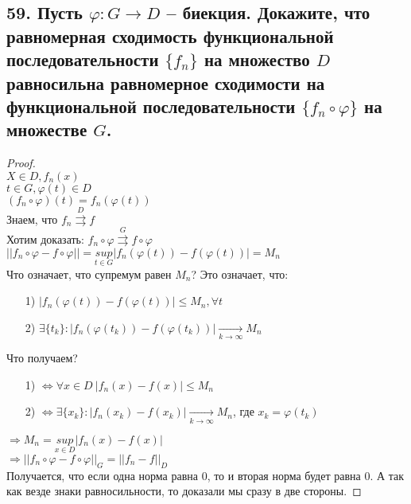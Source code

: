 \documentclass[a4paper, fleqn]{article}
\begin{document}
    \subsection*{59. Пусть $\displaystyle \varphi: G \to D$ -- биекция. Докажите, что
    равномерная сходимость функциональной последовательности $\displaystyle \{f_n\}$
    на множество $\displaystyle D$ равносильна равномерное сходимости на функциональной
    последовательности $\displaystyle \{f_n \circ \varphi\}$ на множестве $G$.
    }
    \begin{proof} \ \\
        $\displaystyle X \in D, f_n(x)$\\
        $ t \in G, \varphi(t) \in D$ \\
        $\displaystyle (f_n \circ \varphi)(t) = f_n(\varphi(t))$ \\
        Знаем, что $\displaystyle f_n \overset{D}{\rightrightarrows} f$ \\
        Хотим доказать: $\displaystyle f_n \circ \varphi \overset{G}{\rightrightarrows}
        f \circ \varphi$ \\[9.5pt]
        $\displaystyle ||f_n \circ \varphi - f \circ \varphi|| =
        \underset{t \in G}{sup} |f_n(\varphi(t)) - f(\varphi(t))| = M_n$ \\ 
        Что означает, что супремум равен $\displaystyle M_n$? Это означает, что:
        \begin{itemize}
            \item[1)] $\displaystyle |f_n(\varphi(t)) - f(\varphi(t))| \leqslant M_n, \forall t$
            \item[2)] $\displaystyle \exists \{t_k\}: |f_n(\varphi(t_k)) - f(\varphi(t_k))|
            \xrightarrow[k \to \infty]{} M_n$ 
        \end{itemize}  
        Что получаем?
        \begin{itemize}
            \item[1)] $\displaystyle \Leftrightarrow \forall x \in D \
            |f_n(x) - f(x)| \leqslant M_n$
            \item[2)] $\displaystyle \Leftrightarrow \exists \{x_k\}: 
            |f_n(x_k) - f(x_k)| \xrightarrow[k \to \infty]{} M_n$, где $\displaystyle x_k =
            \varphi(t_k)$
        \end{itemize}
        $\displaystyle \Rightarrow M_n =
        \underset{x \in D}{sup} |f_n(x) - f(x)|$ \\ 
        $\displaystyle \Rightarrow ||f_n \circ \varphi - f \circ \varphi||_G =
        ||f_n - f||_D$\\
        Получается, что если одна норма равна 0, то и вторая норма будет равна 0. А так как везде
        знаки равносильности, то доказали мы сразу в две стороны.
    \end{proof}
\end{document}
